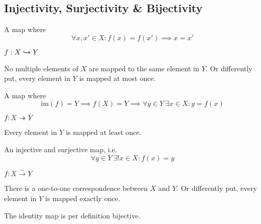 \subsection{Injectivity, Surjectivity \& Bijectivity}
\begin{definition}\label{def:injective}
   A map where
   \[\forall x, x' \in X: f(x) = f(x') \implies x = x'\]
\end{definition}
\begin{remark}[Notation]
   \(f: X \xhookrightarrow{} Y\)
\end{remark}
\begin{remark}
   No multiple elements of \(X\) are mapped to the same element in \(Y\).
   Or differently put, every element in \(Y\) is mapped at most once.
\end{remark}

\begin{definition}\label{def:surjective}
   A map  where
   \[\text{im}(f) = Y \implies f(X) = Y \implies \forall y \in Y~\exists x \in X: y = f(x)\]
\end{definition}
\begin{remark}[Notation]
   \(f: X \twoheadrightarrow Y\)
\end{remark}
\begin{remark}
   Every element in \(Y\) is mapped at least once.
\end{remark}

\begin{definition}\label{def:bijective}
   An injective and surjective map, i.e.
   \[\forall y \in Y~\exists! x \in X: f(x) = y\]
\end{definition}
\begin{remark}[Notation]
   \(f: X \xrightarrow{\sim} Y\)
\end{remark}
\begin{remark}
   There is a one-to-one correspondence between \(X\) and \(Y\).
   Or differently put, every element in \(Y\) is mapped exactly once.
\end{remark}
\begin{example}
   The identity map is per definition bijective.
\end{example}

